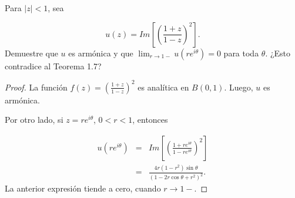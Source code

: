 \documentclass[12pt]{article}
\newtheorem{teo}{Teorema}
\newcommand{\C}{\mathbb{C}}
\newenvironment{problem}[2][Problema]{\begin{trivlist}
\item[\hskip \labelsep {\bfseries #1}\hskip \labelsep {\bfseries #2.}]}{\end{trivlist}}
\begin{document}
\begin{problem}{7 pp. 255}
Para $\lvert z \rvert < 1$, sea 

$$u(z) = Im \left[ \left(  \frac{1+z}{1-z}\right)^2\right].$$
Demuestre que $u$ es armónica y que $\lim_{r \to 1-} u(re^{i \theta}) = 0 $ para toda $\theta$. ¿Esto contradice al Teorema 1.7?
\end{problem}
\begin{proof}
La función $f(z) = \left( \frac{1+z}{1-z}\right)^2$ es analítica en $B(0, 1).$ Luego, $u$ es armónica.

Por otro lado, si $z = re^{i\theta}$, $0 < r < 1$, entonces

\begin{eqnarray*}
u(re^{i\theta}) &=& Im \left[ \left( \frac{1+re^{i\theta}}{1-re^{i\theta}}\right)^2\right]\\
&=& \frac{4r(1-r^2) \sin \theta}{(1-2r \cos \theta + r^2)^2}.
\end{eqnarray*}
La anterior expresión tiende a cero, cuando $r \to 1-.$
\end{proof}




\printbibliography
\end{document}
